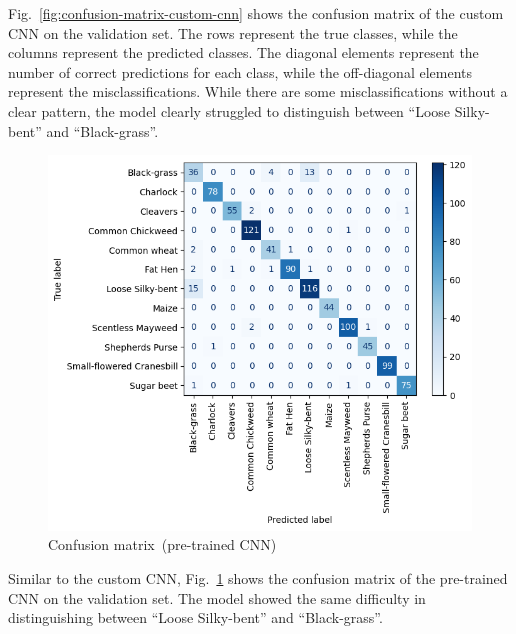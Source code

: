 Fig.~\ref{fig:confusion-matrix-custom-cnn} shows the confusion matrix of the custom CNN on the validation set. The rows represent the true classes, while the columns represent the predicted classes. The diagonal elements represent the number of correct predictions for each class, while the off-diagonal elements represent the misclassifications. While there are some misclassifications without a clear pattern, the model clearly struggled to distinguish between ``Loose Silky-bent'' and ``Black-grass''.

\begin{figure}[htbp]
    \centerline{\includegraphics[width=0.9\linewidth]{../../resources/resnet/confusion.png}}
    \caption{Confusion matrix~(pre-trained CNN)}
    \label{fig:confusion-matrix-pretrained-cnn}
\end{figure}

Similar to the custom CNN, Fig.~\ref{fig:confusion-matrix-pretrained-cnn} shows the confusion matrix of the pre-trained CNN on the validation set. The model showed the same difficulty in distinguishing between ``Loose Silky-bent'' and ``Black-grass''.


